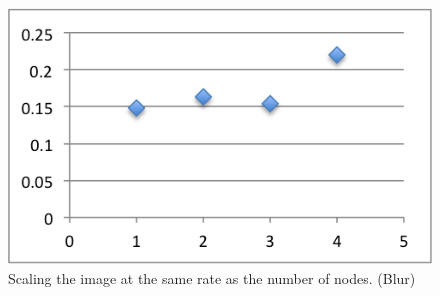 \documentclass[a4paper]{article}
\begin{document}
\begin{figure}
  \centering
  \includegraphics{sameDiffBlur.png}
  \caption{Scaling the image at the same rate as the number of nodes. (Blur)}
  \label{tab:fig6}
\end{figure}
\end{document}
